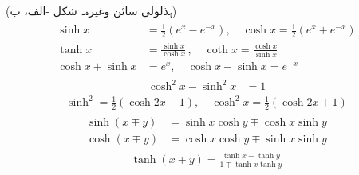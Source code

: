  (ہذلولی سائن  وغیرہ۔ شکل -الف، ب)
\begin{gather}
\begin{aligned}\label{مساوات_ضمیمہ_ہذلولی_حقیقی_تعریف}
\sinh x&=\frac{1}{2}(e^x-e^{-x}),\quad \cosh x=\frac{1}{2}(e^x+e^{-x})\\
\tanh x&=\frac{\sinh x}{\cosh x}\, ,\quad \coth x=\frac{\cosh x}{\sinh x}\\
\cosh x+\sinh x&=e^x,\quad \cosh x-\sinh x=e^{-x}
\end{aligned}
\end{gather}
%
\begin{align}
\cosh^2 x-\sinh^2 x&=1
\end{align}
%
\begin{align}
\sinh^2=\frac{1}{2}(\cosh 2x-1),\quad \cosh^2 x=\frac{1}{2}(\cosh 2x+1)
\end{align}
\begin{gather}
\begin{aligned}
\sinh(x\mp y)&=\sinh x\cosh y\mp \cosh x\sinh y\\
\cosh(x\mp y)&=\cosh x\cosh y\mp \sinh x\sinh y
\end{aligned}
\end{gather}
%
\begin{align}
\tanh(x\mp y)=\frac{\tanh x\mp \tanh y}{1\mp \tanh x\tanh y}
\end{align}
%
